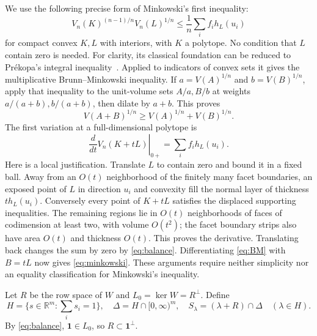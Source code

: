 \documentclass[11pt]{article}
\theoremstyle{remark}\newtheorem{remark}[theorem]{Remark}
\newcommand{\R}{\mathbb R}
\newcommand{\one}{\mathbf 1}
\numberwithin{equation}{section}
\begin{document}
We use the following precise form of Minkowski's first inequality:
\begin{equation}\label{eq:minkowski}
 V_n(K)^{(n-1)/n}V_n(L)^{1/n}
 \le\frac1n\sum_i f_i h_L(u_i)
\end{equation}
for compact convex $K,L$ with interiors, with $K$ a polytope. No condition
that $L$ contain zero is needed. For clarity, its classical foundation
can be reduced to Pr\'ekopa's integral inequality~\cite[Theorem 3]{Prekopa}.
Applied to indicators of convex sets it gives the multiplicative
Brunn--Minkowski inequality. If $a=V(A)^{1/n}$ and $b=V(B)^{1/n}$,
apply that inequality to the unit-volume sets $A/a,B/b$ at weights
$a/(a+b),b/(a+b)$, then dilate by $a+b$. This proves
\begin{equation}\label{eq:BM}
 V(A+B)^{1/n}\ge V(A)^{1/n}+V(B)^{1/n}.
\end{equation}
The first variation at a full-dimensional polytope is
\[
 \left.\frac{d}{dt}V_n(K+tL)\right|_{0+}=\sum_i f_i h_L(u_i).
\]
Here is a local justification. Translate $L$ to contain zero and bound
it in a fixed ball. Away from an $O(t)$ neighborhood of the finitely
many facet boundaries, an exposed point of $L$ in direction $u_i$
and convexity fill the normal layer of thickness $t h_L(u_i)$.
Conversely every point of $K+tL$ satisfies the displaced supporting
inequalities. The remaining regions lie in $O(t)$ neighborhoods of
faces of codimension at least two, with volume $O(t^2)$; the facet
boundary strips also have area $O(t)$ and thickness $O(t)$.
This proves the derivative. Translating back changes the sum by zero
by \eqref{eq:balance}. Differentiating \eqref{eq:BM} with $B=tL$
now gives \eqref{eq:minkowski}. These arguments require neither
simplicity nor an equality classification for Minkowski's inequality.

Let $R$ be the row space of $W$ and $L_0=\ker W=R^\perp$.
Define
\[
 H=\{s\in\R^m:\textstyle\sum_i s_i=1\},\quad
 \Delta=H\cap[0,\infty)^m,\quad
 S_\lambda=(\lambda+R)\cap\Delta\quad(\lambda\in H).
\]
By \eqref{eq:balance}, $\one\in L_0$, so $R\subset\one^\perp$.
\end{document}
